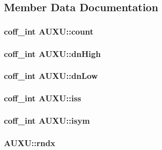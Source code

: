 \subsection{Member Data Documentation}
\hypertarget{unionAUXU_a65a4ab944edcf38e8652f909331762ba}{
\subsubsection[{count}]{\setlength{\rightskip}{0pt plus 5cm}coff\_\-int {\bf AUXU::count}}}
\label{unionAUXU_a65a4ab944edcf38e8652f909331762ba}
\hypertarget{unionAUXU_a7ebafc817c7ce05883534f32ccc89b28}{
\subsubsection[{dnHigh}]{\setlength{\rightskip}{0pt plus 5cm}coff\_\-int {\bf AUXU::dnHigh}}}
\label{unionAUXU_a7ebafc817c7ce05883534f32ccc89b28}
\hypertarget{unionAUXU_a4ad1de46371c0a052485d93d44b9dd8c}{
\subsubsection[{dnLow}]{\setlength{\rightskip}{0pt plus 5cm}coff\_\-int {\bf AUXU::dnLow}}}
\label{unionAUXU_a4ad1de46371c0a052485d93d44b9dd8c}
\hypertarget{unionAUXU_abf7ab39f3d114bfe343d6187238e97a4}{
\subsubsection[{iss}]{\setlength{\rightskip}{0pt plus 5cm}coff\_\-int {\bf AUXU::iss}}}
\label{unionAUXU_abf7ab39f3d114bfe343d6187238e97a4}
\hypertarget{unionAUXU_a83e9abf908e181a2af122dfa0a880341}{
\subsubsection[{isym}]{\setlength{\rightskip}{0pt plus 5cm}coff\_\-int {\bf AUXU::isym}}}
\label{unionAUXU_a83e9abf908e181a2af122dfa0a880341}
\hypertarget{unionAUXU_a94430b9767d7cdd6319772ede408e526}{
\subsubsection[{rndx}]{ {\bf AUXU::rndx}}}
